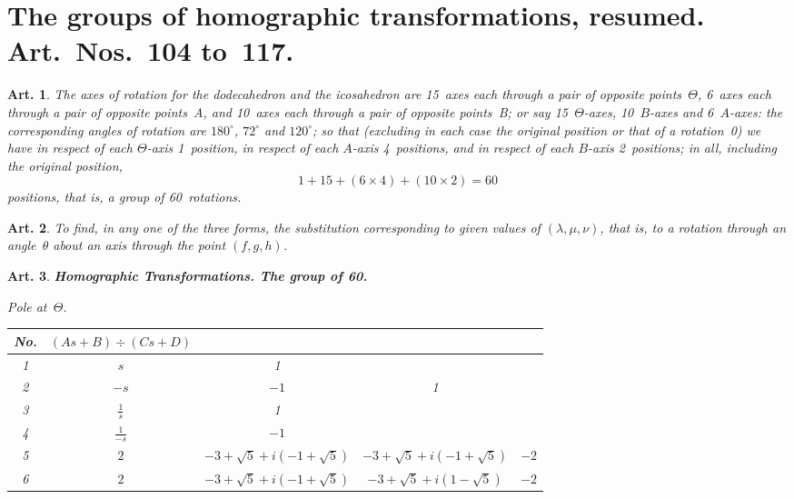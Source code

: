 \documentclass[11pt,a4paper]{article}
\theoremstyle{plain}
\newtheorem{art}{Art.}[section]
\begin{document}
\section*{The groups of homographic transformations, resumed.
Art.~Nos.~104 to~117.}

\begin{art}
The axes of rotation for the dodecahedron and the icosahedron are 15~axes
each through a pair of opposite points~$\Theta$, 6~axes each through a pair
of opposite points~A, and 10~axes each through a pair of opposite
points~B; or say 15~$\Theta$-axes, 10~$B$-axes and 6~$A$-axes: the corresponding
angles of rotation are $180^\circ$, $72^\circ$ and $120^\circ$; so that (excluding in
each case the original position or that of a rotation~0) we have in respect
of each $\Theta$-axis 1~position, in respect of each $A$-axis 4~positions, and in
respect of each $B$-axis 2~positions; in all, including the original position,
\[
1 + 15 + (6 \times 4) + (10 \times 2) = 60
\]
positions, that is, a group of 60~rotations.
\end{art}

\begin{art}
To find, in any one of the three forms, the substitution corresponding to
given values of $(\lambda, \mu, \nu)$, that is, to a rotation through an angle~$\theta$
about an axis through the point $(f, g, h)$.
\end{art}

\begin{art}
\textbf{Homographic Transformations. The group of 60.}

Pole at~$\Theta$.

\begin{center}
\begin{longtable}{|c|c|c|c|c|}
\hline
No. & $(As+B) \div (Cs+D)$ & & & \\
\hline
1 & $s$ & 1 & & \\
2 & $-s$ & $-1$ & 1 & \\
3 & $\frac{1}{s}$ & 1 & & \\
4 & $\frac{1}{-s}$ & $-1$ & & \\
5 & $2$ & $-3+\sqrt{5}+i(-1+\sqrt{5})$ & $-3+\sqrt{5}+i(-1+\sqrt{5})$ & $-2$ \\
6 & $2$ & $-3+\sqrt{5}+i(-1+\sqrt{5})$ & $-3+\sqrt{5}+i(1-\sqrt{5})$ & $-2$ \\
\hline
\end{longtable}
\end{center}
\end{art}
\end{document}
